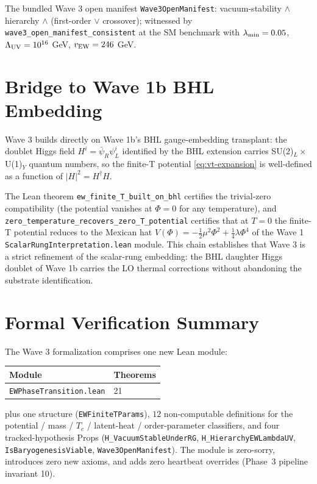 \documentclass[aps,prd,twocolumn,showpacs,superscriptaddress,nofootinbib]{revtex4-2}
\begin{document}
The bundled Wave 3 open manifest
\texttt{Wave3OpenManifest}: vacuum-stability $\land$ hierarchy $\land$
(first-order $\lor$ crossover); witnessed by
\texttt{wave3\_open\_manifest\_consistent} at the SM benchmark with
$\lambda_{\rm min} = 0.05$, $\Lambda_{\rm UV} = 10^{16}$ GeV,
$v_{\rm EW} = 246$ GeV.

\section{Bridge to Wave 1b BHL Embedding}
\label{sec:wave1b-bridge}

Wave 3 builds directly on Wave 1b's BHL gauge-embedding transplant:
the doublet Higgs field $H^i = \bar\psi_R \psi_L^i$ identified by the
BHL extension carries SU(2)$_L \times $ U(1)$_Y$ quantum numbers, so the
finite-T potential \eqref{eq:vt-expansion} is well-defined as a
function of $|H|^2 = H^\dagger H$.

The Lean theorem \texttt{ew\_finite\_T\_built\_on\_bhl} certifies the
trivial-zero compatibility (the potential vanishes at $\Phi = 0$ for
any temperature), and \texttt{zero\_temperature\_recovers\_zero\_T\_potential}
certifies that at $T = 0$ the finite-T potential reduces to the
Mexican hat
$V(\Phi) = -\tfrac{1}{2} \mu^2 \Phi^2 + \tfrac{1}{4} \lambda \Phi^4$
of the Wave 1 \texttt{ScalarRungInterpretation.lean} module. This
chain establishes that Wave 3 is a strict refinement of the
scalar-rung embedding: the BHL daughter Higgs doublet of Wave 1b carries
the LO thermal corrections without abandoning the substrate
identification.

\section{Formal Verification Summary}
\label{sec:formal-verification}

The Wave 3 formalization comprises one new Lean module:
\begin{center}
\begin{tabular}{ll}
\toprule
Module & Theorems \\
\midrule
\texttt{EWPhaseTransition.lean} & 21 \\
\bottomrule
\end{tabular}
\end{center}
plus one structure (\texttt{EWFiniteTParams}), $12$ non-computable
definitions for the potential / mass / $T_c$ / latent-heat / order-parameter
classifiers, and four tracked-hypothesis Props
(\texttt{H\_VacuumStableUnderRG}, \texttt{H\_HierarchyEWLambdaUV},
\texttt{IsBaryogenesisViable}, \texttt{Wave3OpenManifest}). The module
is zero-sorry, introduces zero new axioms, and adds zero heartbeat
overrides (Phase~3 pipeline invariant 10).
\end{document}

